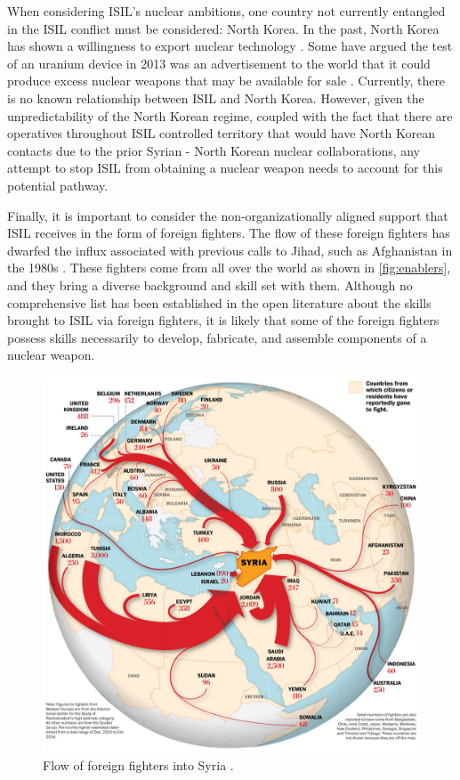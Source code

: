 \documentclass{report}
\begin{document}
When considering ISIL's nuclear ambitions, one country not currently entangled in the ISIL conflict must be considered: North Korea.  In the past, North Korea has shown a willingness to export nuclear technology \cite{Wit2013}.  Some have argued the test of an uranium device in 2013 was an advertisement to the world that it could produce excess nuclear weapons that may be available for sale \cite{Allison2013}.  Currently, there is no known relationship between ISIL and North Korea.  However, given the unpredictability of the North Korean regime, coupled with the fact that there are operatives throughout ISIL controlled territory that would have North Korean contacts due to the prior Syrian - North Korean nuclear collaborations, any attempt to stop ISIL from obtaining a nuclear weapon needs to account for this potential pathway.   


Finally, it is important to consider the non-organizationally aligned support that ISIL receives in the form of foreign fighters.  The flow of these foreign fighters has dwarfed the influx associated with previous calls to Jihad, such as Afghanistan in the 1980s \cite{Barrett2014}.  These fighters come from all over the world as shown in \autoref{fig:enablers}, and they bring a diverse background and skill set with them.  Although no comprehensive list has been established in the open literature about the skills brought to ISIL via foreign fighters, it is likely that some of the foreign fighters possess skills necessarily to develop, fabricate, and assemble components of a nuclear weapon. 

\begin{figure}
 \centering
 \includegraphics[scale=0.6]{./figures/enablers.jpg}
   \caption{Flow of foreign fighters into Syria \cite{Thorp2014}. }
     \label{fig:enablers}
\end{figure}
\end{document}
